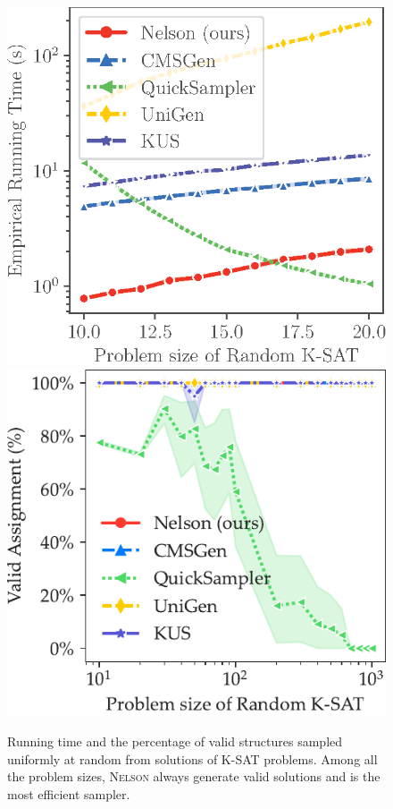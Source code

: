 \documentclass[letterpaper]{article} %
\newcommand{\nls}{\textsc{Nelson}\xspace}
\begin{document}
\begin{figure}[!t]
\centering
\includegraphics[width=0.49\linewidth]{exp/sat/sampling.randkcnf.uniform.time.eps}
\includegraphics[width=0.50\linewidth]{exp/sat/sampling.randkcnf.valid.pdf}
\caption{Running time and the percentage of valid structures sampled  uniformly at random from solutions of K-SAT problems. {Among all the problem sizes}, \nls always generate valid solutions  and is the most efficient sampler.}
\label{fig:uniform_sample}
\end{figure}
\end{document}
